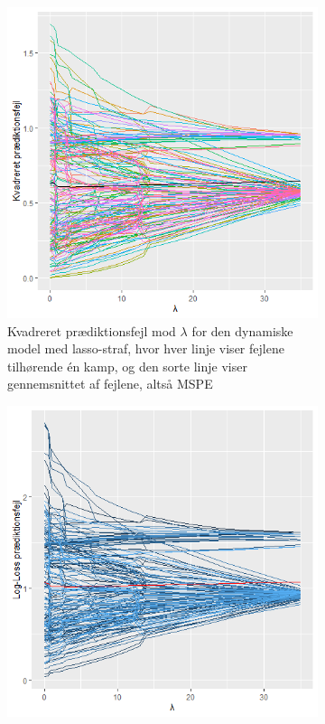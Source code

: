 \documentclass[11pt,a4paper]{article}
\begin{document}
\begin{figure}[h!]
  \centering
  \begin{subfigure}[b]{0.425\linewidth}
    \includegraphics[width=\textwidth]{MSPELINEALPHA.png}
    \caption{Kvadreret prædiktionsfejl mod $\lambda$ for den dynamiske model med lasso-straf, hvor hver linje viser fejlene tilhørende én kamp, og den sorte linje viser gennemsnittet af fejlene, altså MSPE}
    \label{fig:DynMSPELine}
  \end{subfigure}
     \hspace{0.2cm}
  \begin{subfigure}[b]{0.425\linewidth}
\includegraphics[width=\textwidth]{LINELOGLOSSALPHA.png}

\end{subfigure}
\end{figure}
\end{document}
